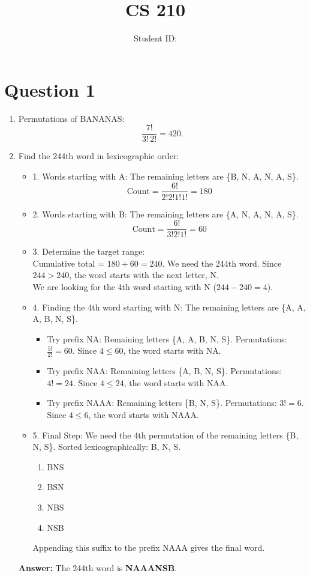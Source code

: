 \documentclass[twoside]{article}
\title{CS 210 \hwNo}
\author{\myname \qquad Student ID:\myid}
\date{}
\begin{document}
\maketitle

\section*{Question 1}
\begin{enumerate}
    \item[(a)] Permutations of BANANAS:\[\frac{7!}{3!\,2!}=420.\]
    \item[(b)] Find the 244th word in lexicographic order:
    \begin{itemize}
        \item 1. Words starting with A: The remaining letters are \{B, N, A, N, A, S\}. \[ \text{Count} = \frac{6!}{2!2!1!1!} = 180 \]
        \item 2. Words starting with B: The remaining letters are \{A, N, A, N, A, S\}. \[ \text{Count} = \frac{6!}{3!2!1!} = 60 \]
        \item 3. Determine the target range: \\
        Cumulative total = $180 + 60 = 240$.
        We need the 244th word. Since $244 > 240$, the word starts with the next letter, N. \\
        We are looking for the 4th word starting with N ($244 - 240 = 4$).
        \item 4. Finding the 4th word starting with N:
        The remaining letters are \{A, A, A, B, N, S\}.
        \begin{itemize}
            \item Try prefix NA: Remaining letters \{A, A, B, N, S\}. 
            Permutations: $\frac{5!}{2!} = 60$. 
            Since $4 \le 60$, the word starts with NA.
            \item Try prefix NAA: Remaining letters \{A, B, N, S\}. 
            Permutations: $4! = 24$.
            Since $4 \le 24$, the word starts with NAA.
            \item Try prefix NAAA: Remaining letters \{B, N, S\}. 
            Permutations: $3! = 6$.
            Since $4 \le 6$, the word starts with NAAA.
        \end{itemize}
        
        \item 5. Final Step:
        We need the 4th permutation of the remaining letters \{B, N, S\}.
        Sorted lexicographically: B, N, S.
        \begin{enumerate}
            \item BNS
            \item BSN
            \item NBS
            \item NSB
        \end{enumerate}
        Appending this suffix to the prefix NAAA gives the final word.
    \end{itemize}
    
    \textbf{Answer:} The 244th word is \textbf{NAAANSB}.
\end{enumerate}
\end{document}
